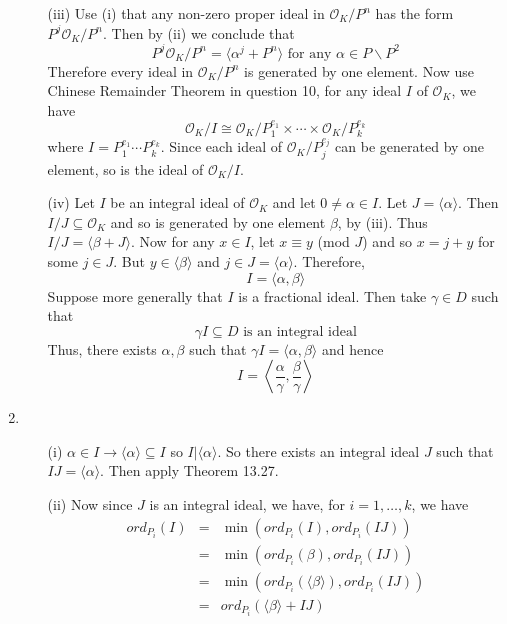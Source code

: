\begin{enumerate}
\begin{enumerate}
    \item[(iii)] Use (i) that any non-zero proper ideal in $\mathcal{O}_K/P^n$ has the form
    $P^j \mathcal{O}_K/P^n$. Then by (ii) we conclude that
    $$P^j \mathcal{O}_K/P^n =\langle \alpha^j+P^n \rangle \text{ for any } \alpha \in P\backslash P^2$$
    Therefore every ideal in $\mathcal{O}_K/P^n$ is generated by one element. Now use Chinese Remainder Theorem in question 10, for any ideal $I$ of $\mathcal{O}_K$, we have
    $$\mathcal{O}_K/I \cong \mathcal{O}_K/P^{e_1}_1 \times \cdots \times \mathcal{O}_K/P^{e_k}_k$$
    where $I=P^{e_1}_1 \cdots P^{e_k}_k$. Since each ideal of $\mathcal{O}_K/P^{e_j}_j$ can be generated by one element, so is the ideal of $\mathcal{O}_K/I$.\\
    \item[(iv)] Let $I$ be an integral ideal of $\mathcal{O}_K$ and let $0 \neq \alpha \in I$. Let
    $J=\langle \alpha \rangle$. Then $I/J \subseteq \mathcal{O}_K$ and so is generated by one element $\beta$, by (iii). Thus $I/J=\langle \beta +J \rangle$. Now for any $x \in I$, let $x \equiv y$ (mod $J$) and so
    $x=j+y$ for some $j \in J$. But $y \in \langle \beta \rangle$ and $j \in J=\langle \alpha \rangle$. Therefore,
    $$I=\langle \alpha, \beta \rangle$$
    Suppose more generally that $I$ is a fractional ideal. Then take $\gamma \in D$ such that
    $$\gamma I \subseteq D \text{ is an integral ideal}$$
    Thus, there exists $\alpha, \beta$ such that $\gamma I =\langle \alpha, \beta \rangle$ and hence
    $$I=\left\langle \frac{\alpha}{\gamma}, \frac{\beta}{\gamma} \right\rangle$$
    \end{enumerate}
\item \begin{enumerate}
    \item[(i)] $\alpha \in I \rightarrow \langle \alpha \rangle \subseteq I$ so $I \big| \langle \alpha \rangle$.
    So there exists an integral ideal $J$ such that $IJ=\langle \alpha \rangle$. Then apply Theorem 13.27.\\
    \item[(ii)] Now since $J$ is an integral ideal, we have, for $i=1,\ldots,k$, we have
    \begin{eqnarray*}
    ord_{P_i}(I)&=&\min{(ord_{P_i}(I),ord_{P_i}(IJ))}\\
    &=&\min{(ord_{P_i}(\beta),ord_{P_i}(IJ))}\\
    &=&\min{(ord_{P_i}(\langle \beta \rangle),ord_{P_i}(IJ))}\\
    &=&ord_{P_i}(\langle \beta \rangle + IJ)

\end{eqnarray*}
\end{enumerate}
\end{enumerate}
